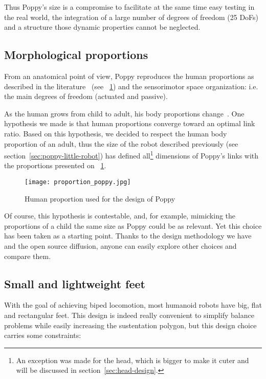 Thus Poppy's size is a compromise to facilitate at the same time easy testing in the real world, the integration of a large number of degrees of freedom (25 DoFs) and a structure those dynamic properties cannot be neglected.

\subsection{Morphological proportions} %

From an anatomical point of view, Poppy reproduces the human proportions as described in the literature~\parencite{dufour2005biomecanique} (see \figurename~\ref{fig:poppy-human-proportion}) and the sensorimotor space organization: i.e. the main degrees of freedom (actuated and passive).

As the human grows from child to adult, his body proportions change~\parencite{bogin2010leg}. One hypothesis we made is that human proportions converge toward an optimal link ratio. Based on this hypothesis, we decided to respect the human body proportion of an adult, thus the size of the robot described previously (see section~\ref{sec:poppy-little-robot}) has defined all\footnote{An exception was made for the head, which is bigger to make it cuter and will be discussed in section~\ref{sec:head-design}.} dimensions  of Poppy's links with the proportions presented on \figurename~\ref{fig:poppy-human-proportion}.

\begin{figure}[tb]
    \centering
        \texttt{[image: proportion\_poppy.jpg]}
    \caption{Human proportion used for the design of Poppy~\parencite{dufour2005biomecanique}}
    \label{fig:poppy-human-proportion}
\end{figure}

Of course, this hypothesis is contestable, and, for example, mimicking the proportions of a child the same size as Poppy could be as relevant. Yet this choice has been taken as a starting point. Thanks to the design methodology we have and the open source diffusion, anyone can easily explore other choices and compare them.

\subsection{Small and lightweight feet} %

With the goal of achieving biped locomotion, most humanoid robots have big, flat and rectangular feet. This design is indeed really convenient to simplify balance problems while easily increasing the sustentation polygon, but this design choice carries some constraints:

